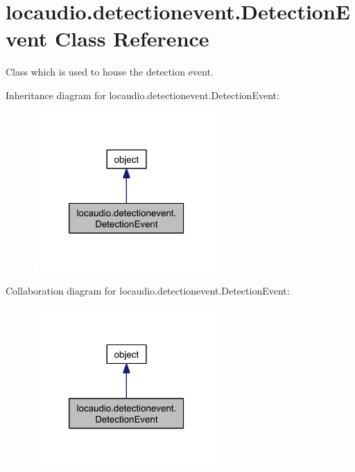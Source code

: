 \hypertarget{classlocaudio_1_1detectionevent_1_1DetectionEvent}{\section{locaudio.\-detectionevent.\-Detection\-Event Class Reference}
\label{classlocaudio_1_1detectionevent_1_1DetectionEvent}
}


Class which is used to house the detection event.  




Inheritance diagram for locaudio.\-detectionevent.\-Detection\-Event\-:\nopagebreak
\begin{figure}[H]
\begin{center}
\leavevmode
\includegraphics[width=202pt]{classlocaudio_1_1detectionevent_1_1DetectionEvent__inherit__graph}
\end{center}
\end{figure}


Collaboration diagram for locaudio.\-detectionevent.\-Detection\-Event\-:\nopagebreak
\begin{figure}[H]
\begin{center}
\leavevmode
\includegraphics[width=202pt]{classlocaudio_1_1detectionevent_1_1DetectionEvent__coll__graph}
\end{center}
\end{figure}
